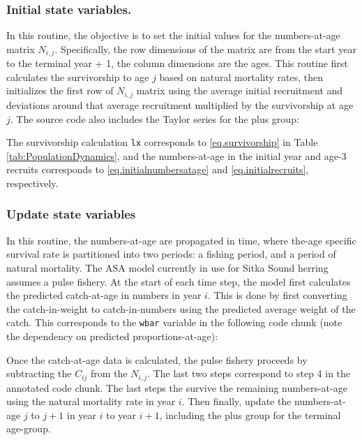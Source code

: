 \documentclass[12pt,letterpaper]{article}
\begin{document}
  \subsubsection{Initial state variables.} %
    \label{ssub:initial_state_variables_}
    
    In this routine, the objective is to set the initial values for the numbers-at-age matrix $N_{i,j}$.  Specifically, the row dimensions of the matrix are from the start year to the terminal year + 1, the column dimensions are the ages.  This routine first calculates the survivorship to age $j$ based on natural mortality rates, then initializes the first row of $N_{i,j}$ matrix using the average initial recruitment and deviations around that average recruitment multiplied by the survivorship at age $j$.  The source code also includes the Taylor series for the plus group:
    

    The survivorship calculation \texttt{lx} corresponds to \eqref{eq.survivorship} in Table \ref{tab:PopulationDynamics}, and the numbers-at-age in the initial year and age-3 recruits corresponds to \eqref{eq.initialnumbersatage} and \eqref{eq.initialrecruits}, respectively.

    \subsubsection{Update state variables} %
    \label{ssub:update_state_variables}
    In this routine, the numbers-at-age are propagated in time, where the-age specific survival rate is partitioned into two periods: a fishing period, and a period of natural mortality.  The ASA model currently in use for Sitka Sound herring assumes a pulse fishery.  At the start of each time step, the model first calculates the predicted catch-at-age in numbers in year $i$. This is done by first converting the catch-in-weight to catch-in-numbers using the predicted average weight of the catch.  This corresponds to the \texttt{wbar} variable in the following code chunk (note the dependency on predicted proportions-at-age):
    
    Once the catch-at-age data is calculated, the pulse fishery proceeds by subtracting the $C_{ij}$  from the $N_{i,j}$.  The last two steps correspond to step 4 in the annotated code chunk. The last steps the survive the remaining numbers-at-age using the natural mortality rate in year $i$. Then finally, update the numbers-at-age $j$ to $j+1$ in year $i$ to year $i+1$, including the plus group for the terminal age-group.
\end{document}
